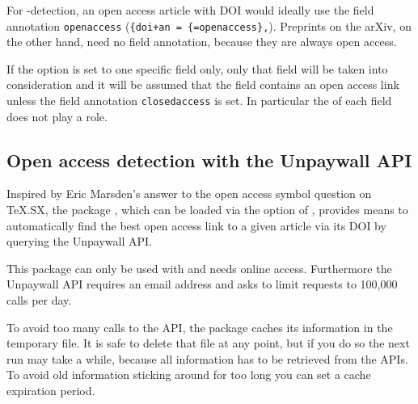 \documentclass[DIV=9]{scrartcl}
\makeatletter
\newcommand*{\exampleprintbib}[1]{%
  \nocite{#1}%
  \let\extblxdoc@examplebib@list\empty
  \def\do##1{\listeadd\extblxdoc@examplebib@list{\detokenize{##1}}}%
  \docsvlist{#1}%
  \printbibliography[check=examplebib, heading=none]}
\makeatother
\begin{document}
For -detection, an open access article with DOI would
ideally use the field annotation \texttt{openaccess}
(\lstinline[style=extblxstylebibtex]|{doi+an = {=openaccess},|).
Preprints on the arXiv, on the other hand, need no field annotation, because
they are always open access.
\makeatletter
\renewcommand{\extblx@oa@marginmark@do}{%
  \vbox to 0pt{%
    \kern-3\dp\strutbox
    \strut
    \hfill
    \rlap{\kern.6em
      \ifhyperref
        {\href{\thefield{bestoaurl}}}
        {\@firstofone}%
      {\oasymbol}}
    \vss
  }%
}
\makeatother
\begin{bibexample}
\exampleprintbib{cipriani,meckes,sigfridsson}
\end{bibexample}

If the  option is set to one specific field only, only
that field will be taken into consideration and it will be assumed that the
field contains an open access link unless the field annotation
\texttt{closedaccess} is set.
In particular the  of each field does not play a role.


\subsection{Open access detection with the Unpaywall API}\label{sec:oa:doiapi}
\label{exltd@itm@biblatex-ext-oa-doiapi}
Inspired by Eric Marsden's%
answer to the open access symbol question on TeX.SX, the package
, which can be loaded via the 
option of , provides means to automatically find the
best open access link to a given article via its DOI by querying the
Unpaywall API.

\begin{warnbox}
This package can only be used with \lualatex{} and needs online
access.
Furthermore the Unpaywall API requires an email address and asks to limit
requests to 100,000 calls per day.
\end{warnbox}

To avoid too many calls to the API, the package caches its information in the
temporary  file.
It is safe to delete that file at any point, but if you do so the next
\lualatex{} run may take a while, because all information has to be retrieved
from the APIs.
To avoid old information sticking around for too long you can set a cache
expiration period.
\end{document}
